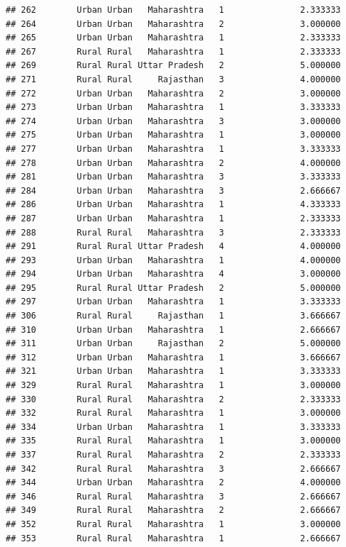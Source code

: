 \documentclass[
]{article}
\begin{document}
\begin{verbatim}
## 262        Urban Urban   Maharashtra   1               2.333333
## 264        Urban Urban   Maharashtra   2               3.000000
## 265        Urban Urban   Maharashtra   1               2.333333
## 267        Rural Rural   Maharashtra   1               2.333333
## 269        Rural Rural Uttar Pradesh   2               5.000000
## 271        Rural Rural     Rajasthan   3               4.000000
## 272        Urban Urban   Maharashtra   2               3.000000
## 273        Urban Urban   Maharashtra   1               3.333333
## 274        Urban Urban   Maharashtra   3               3.000000
## 275        Urban Urban   Maharashtra   1               3.000000
## 277        Urban Urban   Maharashtra   1               3.333333
## 278        Urban Urban   Maharashtra   2               4.000000
## 281        Urban Urban   Maharashtra   3               3.333333
## 284        Urban Urban   Maharashtra   3               2.666667
## 286        Urban Urban   Maharashtra   1               4.333333
## 287        Urban Urban   Maharashtra   1               2.333333
## 288        Rural Rural   Maharashtra   3               2.333333
## 291        Rural Rural Uttar Pradesh   4               4.000000
## 293        Urban Urban   Maharashtra   1               4.000000
## 294        Urban Urban   Maharashtra   4               3.000000
## 295        Rural Rural Uttar Pradesh   2               5.000000
## 297        Urban Urban   Maharashtra   1               3.333333
## 306        Rural Rural     Rajasthan   1               3.666667
## 310        Urban Urban   Maharashtra   1               2.666667
## 311        Urban Urban     Rajasthan   2               5.000000
## 312        Urban Urban   Maharashtra   1               3.666667
## 321        Urban Urban   Maharashtra   1               3.333333
## 329        Rural Rural   Maharashtra   1               3.000000
## 330        Rural Rural   Maharashtra   2               2.333333
## 332        Rural Rural   Maharashtra   1               3.000000
## 334        Urban Urban   Maharashtra   1               3.333333
## 335        Rural Rural   Maharashtra   1               3.000000
## 337        Rural Rural   Maharashtra   2               2.333333
## 342        Rural Rural   Maharashtra   3               2.666667
## 344        Urban Urban   Maharashtra   2               4.000000
## 346        Rural Rural   Maharashtra   3               2.666667
## 349        Rural Rural   Maharashtra   2               2.666667
## 352        Rural Rural   Maharashtra   1               3.000000
## 353        Rural Rural   Maharashtra   1               2.666667

\end{verbatim}
\end{document}
